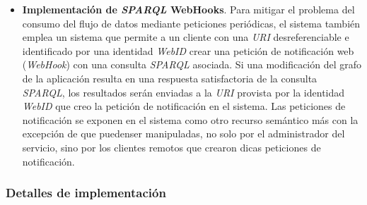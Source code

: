 \begin{itemize}
\item \textbf{Implementaci\'on de \textit{SPARQL} WebHooks}. Para mitigar el problema del consumo del flujo de datos mediante peticiones peri\'odicas, el sistema tambi\'en emplea un sistema que permite a un cliente con una \textit{URI} desreferenciable e identificado por una identidad \textit{WebID} crear una petici\'on de notificaci\'on web (\textit{WebHook}) con una consulta \textit{SPARQL} asociada. Si una modificaci\'on del grafo de la aplicaci\'on resulta en una respuesta satisfactoria de la consulta \textit{SPARQL}, los resultados ser\'an enviadas a la \textit{URI} provista por la identidad \textit{WebID} que creo la petici\'on de notificaci\'on en el sistema. Las peticiones de notificaci\'on se exponen en el sistema como otro recurso sem\'antico m\'as con la excepci\'on de que puedenser manipuladas, no solo por el administrador del servicio, sino por los clientes remotos que crearon dicas peticiones de notificaci\'on.
\end{itemize}

\subsubsection{Detalles de implementaci\'on}

